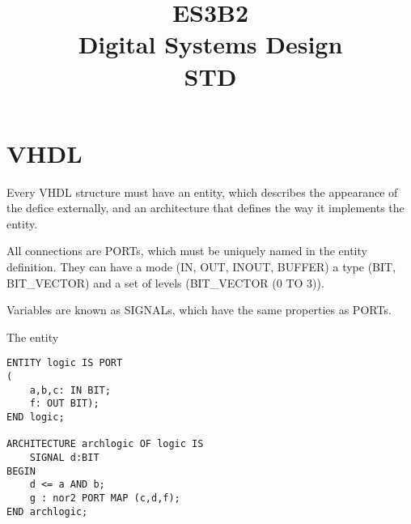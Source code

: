 \documentclass[a4paper,twocolumn]{article}
\title{ES3B2 \\ Digital Systems Design\\ STD}
\begin{document}
	\section{VHDL}
		Every VHDL structure must have an entity,
		which describes the appearance of the defice externally,
		and an architecture that defines the way it implements the entity.

		All connections are PORTs, which must be uniquely named in the entity definition.
		They can have a mode (IN, OUT, INOUT, BUFFER)
		a type (BIT, BIT\_VECTOR)
		and a set of levels (BIT\_VECTOR (0 TO 3)).

		Variables are known as  SIGNALs, which have the same properties as PORTs.

		The entity

\begin{lstlisting}
ENTITY logic IS PORT
(
	a,b,c: IN BIT;
	f: OUT BIT);
END logic;

ARCHITECTURE archlogic OF logic IS
	SIGNAL d:BIT
BEGIN
	d <= a AND b;
	g : nor2 PORT MAP (c,d,f);
END archlogic;
\end{lstlisting}
\end{document}

